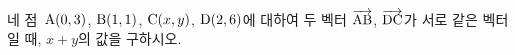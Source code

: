 네 점~$\mathrm{A}(0{,}\mkern3mu\mathopen{}3)$, $\mathrm{B}(1{,}\mkern3mu\mathopen{}1)$, $\mathrm{C}(x{,}\mkern3mu\mathopen{}y)$, $\mathrm{D}(2{,}\mkern3mu\mathopen{}6)$에 대하여 두 벡터 $\overrightarrow{\mathrm{AB}}$, $\overrightarrow{\mathrm{DC}}$가 서로 같은 벡터일 때, $x+y$의 값을 구하시오.
